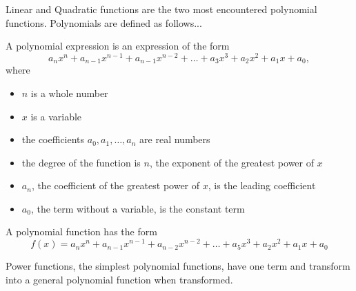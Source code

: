 \documentclass{article}
\begin{document}
\begin{minipage}[t]{\textwidth}
Linear and Quadratic functions are the two most encountered polynomial functions. Polynomials are defined as follows...

A polynomial expression is an expression of the form
\[
a_n x^n + a_{n-1} x^{n-1} + a_{n-1} x^{n-2} + \ldots + a_3 x^3 + a_2 x^2 + a_1 x + a_0,
\]
where
\begin{itemize}
    \item \( n \) is a whole number
    \item \( x \) is a variable
    \item the coefficients \( a_0, a_1, \ldots, a_n \) are real numbers
    \item the degree of the function is \( n \), the exponent of the greatest power of \( x \)
    \item \( a_n \), the coefficient of the greatest power of \( x \), is the leading coefficient
    \item \( a_0 \), the term without a variable, is the constant term
\end{itemize}

A polynomial function has the form
\[
f(x) = a_n x^n + a_{n-1} x^{n-1} + a_{n-2} x^{n-2} + \ldots + a_5 x^3 + a_2 x^2 + a_1 x + a_0
\]

Power functions, the simplest polynomial functions, have one term and transform into a general polynomial function when transformed.
\end{minipage}

\vspace{0.5cm}

\begin{center}
\begin{minipage}[t]{0.8\textwidth}
\centering
{}
\end{minipage}\\


\end{center}
\end{document}
